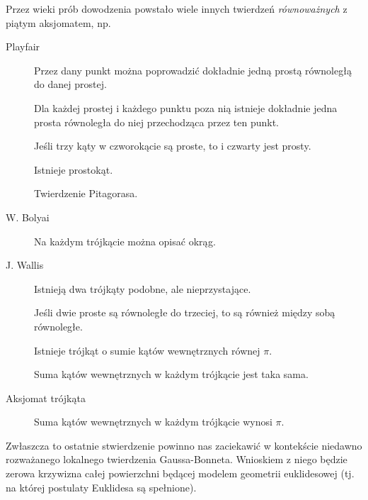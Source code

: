 \begin{frame}[<+->]
Przez wieki prób dowodzenia powstało wiele innych twierdzeń \textit{równoważnych} z piątym aksjomatem, np.
\begin{description}
\item [Playfair] Przez dany punkt można poprowadzić dokładnie jedną prostą równoległą do danej prostej.
\item [\textbullet]Dla każdej prostej i każdego punktu poza nią istnieje dokładnie jedna prosta równoległa do niej przechodząca przez ten punkt.
\item [\textbullet]Jeśli trzy kąty w czworokącie są proste, to i czwarty jest prosty.
\item [\textbullet]Istnieje prostokąt.
\item [\textbullet]Twierdzenie Pitagorasa.
\item [W. Bolyai] Na każdym trójkącie można opisać okrąg.
\end{description}
\end{frame}
\begin{frame}
\begin{description}
\item [J. Wallis] Istnieją dwa trójkąty podobne, ale nieprzystające.
\pause\item [\textbullet]Jeśli dwie proste są równoległe do trzeciej, to są również między sobą równoległe.
\pause\item [\textbullet]Istnieje trójkąt o sumie kątów wewnętrznych równej $\pi$.
\pause\item [\textbullet]Suma kątów wewnętrznych w każdym trójkącie jest taka sama.
\pause\item [Aksjomat trójkąta] Suma kątów wewnętrznych w każdym trójkącie wynosi $\pi$.
\end{description}

\end{frame}
Zwłaszcza to ostatnie stwierdzenie powinno nas zaciekawić w kontekście niedawno rozważanego lokalnego twierdzenia Gaussa-Bonneta. Wnioskiem z niego będzie zerowa krzywizna całej powierzchni będącej modelem geometrii euklidesowej (tj. na której postulaty Euklidesa są spełnione).


